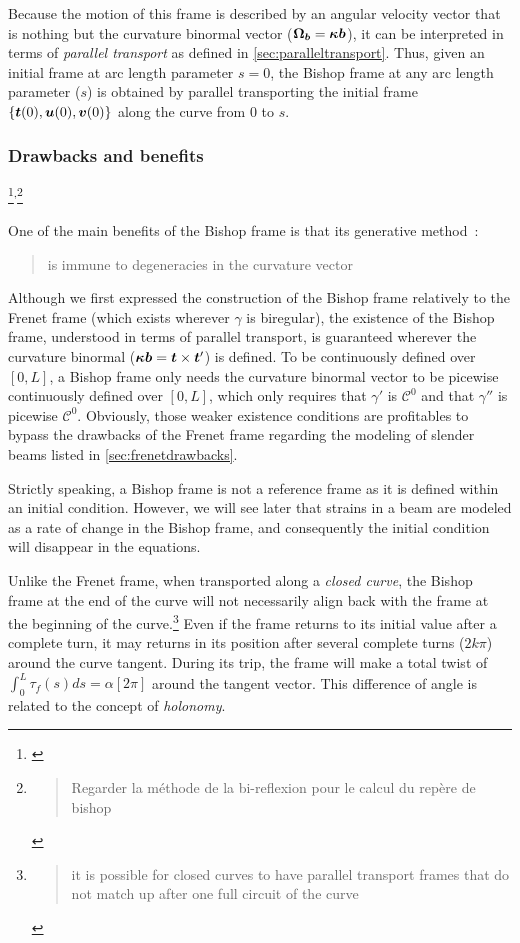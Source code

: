 Because the motion of this frame is described by an angular velocity vector that is nothing but the curvature binormal vector ($\boldsymbol{\Omega_b} = \boldsymbol{\kappa b}$), it can be interpreted in terms of \emph{parallel transport} as defined in \cref{sec:paralleltransport}. Thus, given an initial frame at arc length parameter $s=0$, the Bishop frame at any arc length parameter ($s$) is obtained by parallel transporting the initial frame $\{\boldsymbol{t}(0),\boldsymbol{u}(0), \boldsymbol{v}(0)\}$ along the curve from $0$ to $s$.

\subsubsection{Drawbacks and benefits}
\footnote{\cite{Guggenheimer1989, Klok1986, Bloomenthal1990, Wang2008, Poston1995, Menninger2013}}\textsuperscript{,}\footnote{\blockcquote[p.6]{Wang2008}{Regarder la méthode de la bi-reflexion pour le calcul du repère de bishop}}

One of the main benefits of the Bishop frame is that its generative method~: \blockcquote{Bloomenthal1990}{is immune to degeneracies in the curvature vector}. Although we first expressed the construction of the Bishop frame relatively to the Frenet frame (which exists wherever $\gamma$ is biregular), the existence of the Bishop frame, understood in terms of parallel transport, is guaranteed wherever the curvature binormal ($\boldsymbol{\kappa b} = \boldsymbol{t} \times \boldsymbol{t}'$) is defined. To be continuously defined over $[0,L]$, a Bishop frame only needs the curvature binormal vector to be picewise continuously defined over  $[0,L]$, which only requires that $\gamma'$ is $\mathcal{C}^0$ and that $\gamma''$ is picewise $\mathcal{C}^0$. Obviously, those weaker existence conditions are profitables to bypass the drawbacks of the Frenet frame regarding the modeling of slender beams listed in \cref{sec:frenetdrawbacks}.

Strictly speaking, a Bishop frame is not a reference frame as it is defined within an initial condition. However, we will see later that strains in a beam are modeled as a rate of change in the Bishop frame, and consequently the initial condition will disappear in the equations.

Unlike the Frenet frame, when transported along a \emph{closed curve}, the Bishop frame at the end of the curve will not necessarily align back with the frame at the beginning of the curve.\footnote{\blockcquote{Hanson95}{it is possible for closed curves to have parallel transport frames that do not match up after one full circuit of the curve}} Even if the frame returns to its initial value after a complete turn, it may returns in its position after several complete turns ($2k\pi$) around the curve tangent. During its trip, the frame will make a total twist of $\int_0^L \tau_f(s)ds = \alpha[2\pi]$ around the tangent vector. This difference of angle is related to the concept of  \emph{holonomy}.


